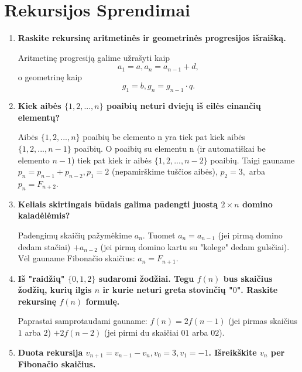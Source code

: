 \section{Rekursijos Sprendimai}

\bigskip
\begin{enumerate}

\item {\bf Raskite rekursinę aritmetinės ir geometrinės progresijos išraišką.}

Aritmetinę progresiją galime užrašyti kaip $$a_1 = a, a_n = a_{n-1} + d,$$ o geometrinę kaip $$g_1 = b, g_n = g_{n-1}\cdot q.$$ \medskip
  
\item {\bf Kiek aibės $\{1,2,...,n\}$ poaibių neturi dviejų iš eilės einančių elementų?} 

Aibės $\{1,2,...,n\}$ poaibių be elemento n yra tiek pat kiek aibės $\{1,2,...,n-1\}$ poaibių. O poaibių su elementu n (ir automatiškai be elemento $n-1$) tiek pat kiek ir aibės $\{1,2,...,n-2\}$ poaibių. Taigi gauname $p_n = p_{n-1} + p_{n-2}, p_1 = 2$ (nepamirškime tuščios aibės), $p_2 = 3,$ arba $p_n = F_{n+2}$. \medskip
  
\item {\bf Keliais skirtingais būdais galima padengti juostą $2\times n$ domino kaladėlėmis?}

Padengimų skaičių pažymėkime $a_n$. Tuomet $a_n = a_{n-1}$ (jei pirmą domino dedam stačiai) $+ a_{n-2}$ (jei pirmą domino kartu su "kolege" dedam gulsčiai). Vėl gauname Fibonačio skaičius: $a_n = F_{n+1}.$ \medskip
  
\item {\bf Iš "raidžių" $\{0,1,2\}$ sudaromi žodžiai. Tegu $f(n)$ bus skaičius žodžių, kurių ilgis $n$ ir kurie neturi greta stovinčių "$0$". Raskite rekursinę $f(n)$ formulę.} 

Paprastai samprotaudami gauname: $f(n) = 2f(n-1)$ (jei pirmas skaičius $1$ arba $2$) $+ 2f(n-2)$ (jei pirmi du skaičiai $01$ arba $02$).\medskip

\item {\bf Duota rekursija $v_{n+1} = v_{n-1} - v_{n}, v_0 =3, v_1=-1$. Išreikškite $v_n$ per Fibonačio skaičius.}


\end{enumerate}
